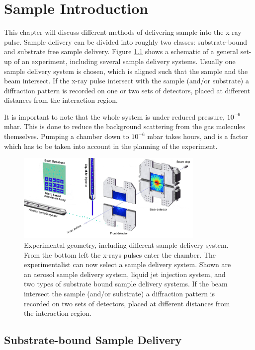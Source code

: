 \chapter{Sample Introduction}
This chapter will discuss different methods of delivering sample into the x-ray pulse. Sample delivery can be divided into roughly two classes: substrate-bound and substrate free sample delivery. Figure \ref{fig:experimental_geometry} shows a schematic of a general set-up of an experiment, including several sample delivery systems. Usually one sample delivery system is chosen, which is aligned such that the sample and the beam intersect. If the x-ray pulse intersect with the sample (and/or substrate) a diffraction pattern is recorded on one or two sets of detectors, placed at different distances from the interaction region.

It is important to note that the whole system is under reduced pressure, $10^{-6}$ mbar. This is done to reduce the background scattering from the gas molecules themselves. Pumping a chamber down to $10^{-6}$ mbar takes hours, and is a factor which has to be taken into account in the planning of the experiment. 

\begin{figure}[h]\label{fig:experimental_geometry}
\centering 
\includegraphics[width=90mm]{setup_cropped.png}
\caption{Experimental geometry, including different sample delivery system. From the bottom left the x-rays pulses enter the chamber. The experimentalist can now select a sample delivery system. Shown are an aerosol sample delivery system, liquid jet injection system, and two types of substrate bound sample delivery systems. If the beam intersect the sample (and/or substrate) a diffraction pattern is recorded on two sets of detectors, placed at different distances from the interaction region.}
\end{figure}

\section{Substrate-bound Sample Delivery}
